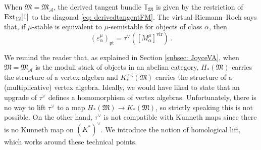 \documentclass[12pt]{amsart}
\theoremstyle{definition}
\newcommand{\BT}{{\mathbb{T}}}
\newcommand{\CA}{{\mathcal A}}
\newcommand{\1}{\mathbf 1}
\newcommand{\FM}{{\mathfrak{M}}}
\newcommand{\Ext}{\mathcal{E}\text{xt}}
\newcommand{\pt}{{\mathsf{pt}}}
\newcommand{\vir}{\mathrm{vir}}
\newcommand{\reg}{\mathrm{reg}}
\renewcommand{\Ext}{\textup{Ext}}
\begin{document}
When $\FM=\FM_\CA$, the derived tangent bundle $\BT_{\FM}$ is given by the restriction of $\Ext_{12}[1]$ to the diagonal \eqref{eq: derivedtangentFM}. The virtual Riemann--Roch says that, if $\mu$-stable is equivalent to $\mu$-semistable for objects of class $\alpha$, then
\[(\varepsilon_\alpha^\mu)_\pt=\tau^\vee([M_\alpha^\mu]^\vir)\,.\]

We remind the reader that, as explained in Section \ref{subsec: JoyceVA}, when $\FM=\FM_\CA$ is the moduli stack of objects in an abelian category, $H_\ast(\FM)$ carries the structure of a vertex algebra and $K_\ast^\reg(\FM)$ carries the structure of a (multiplicative) vertex algebra. Ideally, we would have liked to state that an upgrade of $\tau^\vee$ defines a homomorphism of vertex algebras. Unfortunately, there is no way to lift $\tau^\vee$ to a map $H_\ast(\FM)\to K_\ast(\FM)$, so strictly speaking this is not possible. On the other hand, $\tau^\vee$ is not compatible with Kunneth maps since there is no Kunneth map on $(K^\ast)^\vee$. We introduce the notion of homological lift, which works around these technical points.
\end{document}

